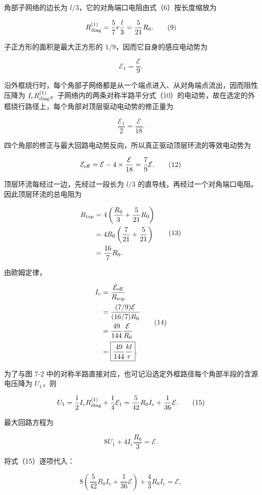 \documentclass[12pt,a4paper,UTF8]{ctexart}
\begin{document}
角部子网络的边长为 \(l/3\)，它的对角端口电阻由式（6）按长度缩放为

\[
R_{\rm diag}^{(1)}
=\frac57r\frac l3
=\frac5{21}R_0. \tag{9}
\]

子正方形的面积是最大正方形的 \(1/9\)，因而它自身的感应电动势为

\[
\mathcal E_1=\frac{\mathcal E}{9}. \tag{10}
\]

沿外框绕行时，每个角部子网络都是从一个端点进入、从对角端点流出，因而阻性压降为
\(I_cR_{\rm diag}^{(1)}\)。子网络内的两条对称半路平分式（10）的电动势，故在选定的外框绕行路径上，每个角部对顶层驱动电动势的修正量为

\[
\frac{\mathcal E_1}{2}=\frac{\mathcal E}{18}. \tag{11}
\]

四个角部的修正与最大回路电动势反向，所以真正驱动顶层环流的等效电动势为

\[
\mathcal E_{\rm eff}
=\mathcal E-4\times\frac{\mathcal E}{18}
=\frac79\mathcal E. \tag{12}
\]

顶层环流每经过一边，先经过一段长为 \(l/3\)
的直导线，再经过一个对角端口电阻。因此顶层环流的总电阻为

\[
\begin{aligned}
R_{\rm top}
&=4\left(\frac{R_0}{3}+\frac5{21}R_0\right)\\
&=4R_0\left(\frac7{21}+\frac5{21}\right)\\
&=\frac{16}{7}R_0. 
\end{aligned}
\tag{13}
\]

由欧姆定律，

\[
\begin{aligned}
I_c
&=\frac{\mathcal E_{\rm eff}}{R_{\rm top}}\\
&=\frac{(7/9)\mathcal E}{(16/7)R_0}\\
&=\frac{49}{144}\frac{\mathcal E}{R_0}\\
&=\boxed{\frac{49}{144}\frac{kl}{r}}. 
\end{aligned}
\tag{14}
\]

为了与图 7-2
中的对称半路直接对应，也可记沿选定外框路径每个角部半段的含源电压降为
\(U_1\)，则

\[
U_1=\frac12I_cR_{\rm diag}^{(1)}+\frac14\mathcal E_1
=\frac5{42}R_0I_c+\frac1{36}\mathcal E. \tag{15}
\]

最大回路方程为

\[
8U_1+4I_c\frac{R_0}{3}=\mathcal E. \tag{16}
\]

将式（15）逐项代入：

\[
8\left(\frac5{42}R_0I_c+\frac1{36}\mathcal E\right)
+\frac43R_0I_c=\mathcal E,
\]
\end{document}
